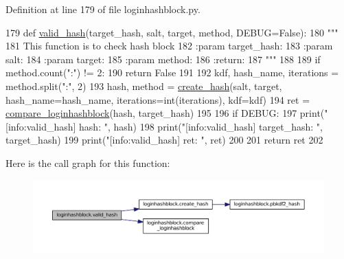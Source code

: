 Definition at line 179 of file loginhashblock.\+py.


\begin{DoxyCode}
179 \textcolor{keyword}{def }\hyperlink{namespaceloginhashblock_ac7faa165bc305e611390727f11946424}{valid\_hash}(target\_hash, salt, target, method, DEBUG=False):
180     \textcolor{stringliteral}{"""}
181 \textcolor{stringliteral}{    This function is to check hash block}
182 \textcolor{stringliteral}{    :param target\_hash:}
183 \textcolor{stringliteral}{    :param salt:}
184 \textcolor{stringliteral}{    :param target:}
185 \textcolor{stringliteral}{    :param method:}
186 \textcolor{stringliteral}{    :return:}
187 \textcolor{stringliteral}{    """}
188 
189     \textcolor{keywordflow}{if} method.count(\textcolor{stringliteral}{":"}) != 2:
190         \textcolor{keywordflow}{return} \textcolor{keyword}{False}
191 
192     kdf, hash\_name, iterations = method.split(\textcolor{stringliteral}{":"}, 2)
193     hash, method = \hyperlink{namespaceloginhashblock_a935d8ae1c51e50f9e5db6a1d5f02b1b8}{create\_hash}(salt, target, hash\_name=hash\_name, iterations=int(iterations), 
      kdf=kdf)
194     ret = \hyperlink{namespaceloginhashblock_ac24dd842eb90e0ede55e842d44148d5b}{compare\_loginhashblock}(hash, target\_hash)
195 
196     \textcolor{keywordflow}{if} DEBUG:
197         print(\textcolor{stringliteral}{"[info:valid\_hash]        hash: "}, hash)
198         print(\textcolor{stringliteral}{"[info:valid\_hash] target\_hash: "}, target\_hash)
199         print(\textcolor{stringliteral}{"[info:valid\_hash]         ret: "}, ret)
200 
201     \textcolor{keywordflow}{return} ret
202 
\end{DoxyCode}


Here is the call graph for this function\+:\nopagebreak
\begin{figure}[H]
\begin{center}
\leavevmode
\includegraphics[width=350pt]{namespaceloginhashblock_ac7faa165bc305e611390727f11946424_cgraph}
\end{center}
\end{figure}


